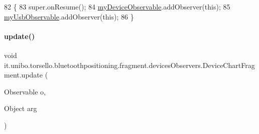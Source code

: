 \begin{DoxyCode}
82                            \{
83         super.onResume();
84         \hyperlink{classit_1_1unibo_1_1torsello_1_1bluetoothpositioning_1_1fragment_1_1devicesObservers_1_1DeviceChartFragment_a2c8de6418fffdb5affe4de22185b55eb_a2c8de6418fffdb5affe4de22185b55eb}{myDeviceObservable}.addObserver(\textcolor{keyword}{this});
85         \hyperlink{classit_1_1unibo_1_1torsello_1_1bluetoothpositioning_1_1fragment_1_1devicesObservers_1_1DeviceChartFragment_a577dad67b3eabc0f48e95d08e9f5881b_a577dad67b3eabc0f48e95d08e9f5881b}{myUsbObservable}.addObserver(\textcolor{keyword}{this});
86     \}
\end{DoxyCode}
\hypertarget{classit_1_1unibo_1_1torsello_1_1bluetoothpositioning_1_1fragment_1_1devicesObservers_1_1DeviceChartFragment_a83fb3f76a108192b8df7640cfafcd98d_a83fb3f76a108192b8df7640cfafcd98d}{}\label{classit_1_1unibo_1_1torsello_1_1bluetoothpositioning_1_1fragment_1_1devicesObservers_1_1DeviceChartFragment_a83fb3f76a108192b8df7640cfafcd98d_a83fb3f76a108192b8df7640cfafcd98d} 
\paragraph{\texorpdfstring{update()}{update()}}
{\footnotesize\ttfamily void it.\+unibo.\+torsello.\+bluetoothpositioning.\+fragment.\+devices\+Observers.\+Device\+Chart\+Fragment.\+update (\begin{DoxyParamCaption}\item[{Observable}]{o,  }\item[{Object}]{arg }\end{DoxyParamCaption})}


